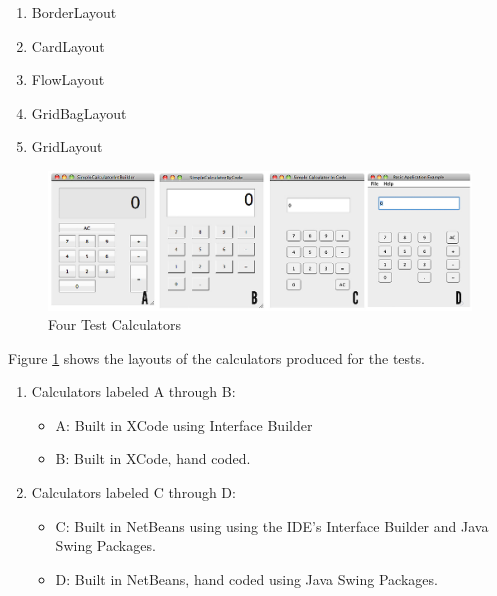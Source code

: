 \documentclass[a4paper,14pt]{article}
\begin{document}
\begin{enumerate}
		\item BorderLayout
		\item CardLayout
		\item FlowLayout
		\item GridBagLayout
		\item GridLayout
\end{enumerate}

\begin{figure}[H]
\centering
\includegraphics[scale=1.0]{Calculators.eps}
\caption{Four Test Calculators}
\label{fig:calculators}
\end{figure}
Figure \ref{fig:calculators} shows the layouts of the calculators produced for the tests.
\begin{enumerate}
\item Calculators labeled A through B:
	\begin{itemize}
	    \item A: Built in XCode using Interface Builder
	    \item B: Built in XCode, hand coded.
	\end{itemize} 
	\item Calculators labeled C through D:
		\begin{itemize}
		    \item C: Built in NetBeans using using the IDE's Interface Builder and Java Swing Packages.
		    \item D: Built in NetBeans, hand coded using Java Swing Packages.
		\end{itemize}
\end{enumerate}
\end{document}
